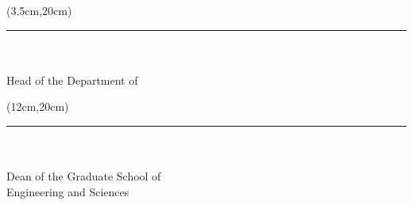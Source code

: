 \begin{spacing}{1}

	\begin{textblock*}{\textwidth}(3.5cm,20cm)
		\noindent\rule{5cm}{0.1mm}\\
		\textbf{\HeadOfTheDepartmentTitle{ }\HeadOfTheDepartmentName{}
		\MakeUppercase\HeadOfTheDepartmentSurname}\\
		Head of the Department of\\
		\HeadOfTheDepartmentDepartment
	\end{textblock*}

	\begin{textblock*}{\textwidth}(12cm,20cm)
		\noindent\rule{5cm}{0.1mm}\\
		\textbf{\HeadOfTheGraduateSchoolTitle{ }\HeadOfTheGraduateSchoolName{}
		\MakeUppercase\HeadOfTheGraduateSchoolSurname}\\
		Dean of the Graduate School of\\
		Engineering and Sciences
	\end{textblock*}
\end{spacing}
~\pagebreak
